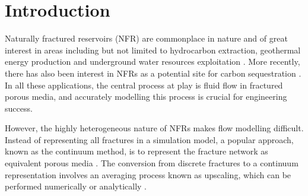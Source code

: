 \documentclass[draft]{agujournal2018}
\begin{document}
%


%
%
%
%


\section{Introduction}
Naturally fractured reservoirs (NFR) are commonplace in nature and of great interest in areas including but not limited to hydrocarbon extraction, geothermal energy production and underground water resources exploitation \citep{Berkowitz2002}. More recently, there has also been 
interest in NFRs as a potential site for carbon sequestration \citep{March2018}. In all these applications, the central process at play is fluid flow in fractured porous media, and accurately modelling this process is crucial for engineering success.

However, the highly heterogeneous nature of NFRs makes flow modelling difficult. Instead of representing all fractures in a simulation model, a popular approach, known as the continuum method, is to represent the fracture network as equivalent porous media \citep{Ezulike2013, Lemonnier2010a, Lemonnier2010, Warren1963, Yan2016}. The conversion from discrete fractures to a continuum representation involves an averaging process known as upscaling, which can be performed numerically or analytically \citep{Durlofsky1991,Oda1985,Renard1997,Saevik2013}. 
\end{document}
